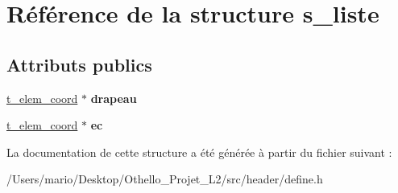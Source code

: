 \hypertarget{structs__liste}{}\section{Référence de la structure s\+\_\+liste}
\label{structs__liste}
\subsection*{Attributs publics}
\begin{DoxyCompactItemize}
\item 
\mbox{\label{structs__liste_a2168f226b2e2e804d1a4a683cc5d337a}} 
\mbox{\hyperlink{structs__elem__coord}{t\+\_\+elem\+\_\+coord}} $\ast$ {\bfseries drapeau}
\item 
\mbox{\label{structs__liste_a20b2b17880d0777239c5fbd8e33afe36}} 
\mbox{\hyperlink{structs__elem__coord}{t\+\_\+elem\+\_\+coord}} $\ast$ {\bfseries ec}
\end{DoxyCompactItemize}


La documentation de cette structure a été générée à partir du fichier suivant \+:\begin{DoxyCompactItemize}
\item 
/\+Users/mario/\+Desktop/\+Othello\+\_\+\+Projet\+\_\+\+L2/src/header/define.\+h\end{DoxyCompactItemize}
